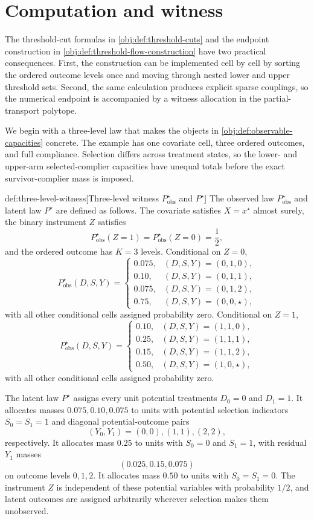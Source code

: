 \section{Computation and witness}\label{sec:algorithm-example}

The threshold-cut formulas in \cref{obj:def:threshold-cuts} and the endpoint construction in \cref{obj:def:threshold-flow-construction} have two practical consequences.  First, the construction can be implemented cell by cell by sorting the ordered outcome levels once and moving through nested lower and upper threshold sets.  Second, the same calculation produces explicit sparse couplings, so the numerical endpoint is accompanied by a witness allocation in the partial-transport polytope.

We begin with a three-level law that makes the objects in \cref{obj:def:observable-capacities} concrete.  The example has one covariate cell, three ordered outcomes, and full compliance.  Selection differs across treatment states, so the lower- and upper-arm selected-complier capacities have unequal totals before the exact survivor-complier mass is imposed.

\begin{definitionv}{def:three-level-witness}[Three-level witness \(P_{\mathrm{obs}}^{\star}\) and \(P^{\star}\)]
The observed law \(P_{\mathrm{obs}}^{\star}\) and latent law \(P^{\star}\) are defined as follows. The covariate satisfies \(X=x^{\star}\) almost surely, the binary instrument \(Z\) satisfies
\[
P_{\mathrm{obs}}^{\star}(Z=1)=P_{\mathrm{obs}}^{\star}(Z=0)=\frac12,
\]
and the ordered outcome has \(K=3\) levels. Conditional on \(Z=0\),
\[
P_{\mathrm{obs}}^{\star}(D,S,Y) =
\begin{cases}
0.075, & (D,S,Y)=(0,1,0),\\
0.10, & (D,S,Y)=(0,1,1),\\
0.075, & (D,S,Y)=(0,1,2),\\
0.75, & (D,S,Y)=(0,0,\star),
\end{cases}
\]
with all other conditional cells assigned probability zero. Conditional on \(Z=1\),
\[
P_{\mathrm{obs}}^{\star}(D,S,Y) =
\begin{cases}
0.10, & (D,S,Y)=(1,1,0),\\
0.25, & (D,S,Y)=(1,1,1),\\
0.15, & (D,S,Y)=(1,1,2),\\
0.50, & (D,S,Y)=(1,0,\star),
\end{cases}
\]
with all other conditional cells assigned probability zero.

The latent law \(P^{\star}\) assigns every unit potential treatments \(D_0=0\) and \(D_1=1\). It allocates masses \(0.075,0.10,0.075\) to units with potential selection indicators \(S_0=S_1=1\) and diagonal potential-outcome pairs
\[
(Y_0,Y_1)=(0,0),(1,1),(2,2),
\]
respectively. It allocates mass \(0.25\) to units with \(S_0=0\) and \(S_1=1\), with residual \(Y_1\) masses
\[
(0.025,0.15,0.075)
\]
on outcome levels \(0,1,2\). It allocates mass \(0.50\) to units with \(S_0=S_1=0\). The instrument \(Z\) is independent of these potential variables with probability \(1/2\), and latent outcomes are assigned arbitrarily wherever selection makes them unobserved.
\end{definitionv}

